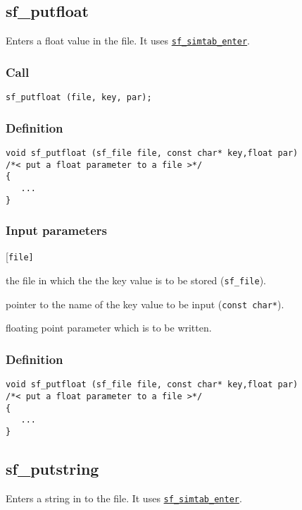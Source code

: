 \subsection{{sf\_putfloat}}
Enters a float value in the file. It uses \hyperref[sec:sf_simtab_enter]{\texttt{sf\_simtab\_enter}}.  

\subsubsection*{Call}
\begin{verbatim}sf_putfloat (file, key, par);\end{verbatim}

\subsubsection*{Definition}
\begin{verbatim}
void sf_putfloat (sf_file file, const char* key,float par)
/*< put a float parameter to a file >*/
{
   ...
}
\end{verbatim}

\subsubsection*{Input parameters}
\begin{desclist}{\tt }{\quad}[\tt file]
   \setlength\itemsep{0pt}
   \item[file] the file in which the the key value is to be stored (\texttt{sf\_file}).
   \item[key]  pointer to the name of the key value to be input (\texttt{const char*}).
   \item[par]  floating point parameter which is to be written.
\end{desclist}

\subsubsection*{Definition}
\begin{verbatim}
void sf_putfloat (sf_file file, const char* key,float par)
/*< put a float parameter to a file >*/
{
   ...
}
\end{verbatim}




\subsection{{sf\_putstring}}
Enters a string in to the file. It uses \hyperref[sec:sf_simtab_enter]{\texttt{sf\_simtab\_enter}}.  

